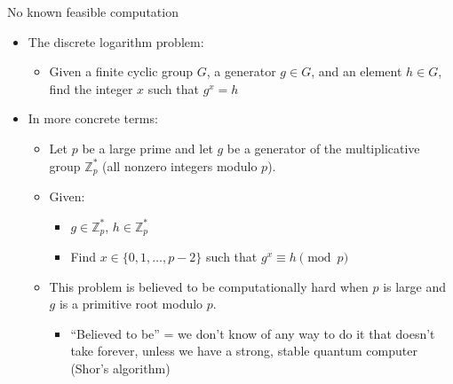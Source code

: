 \documentclass[aspectratio=169, lualatex, handout]{beamer}
\begin{document}
	\begin{frame}{No known feasible computation}
		\begin{itemize}
			\item The discrete logarithm problem:
				\begin{itemize}
					\item Given a finite cyclic group $G$, a generator $g \in G$, and an element
						$h \in G$, find the integer $x$ such that $g^{x}=h$
				\end{itemize}

			\item In more concrete terms:
				\begin{itemize}
					\item Let $p$ be a large prime and let $g$ be a generator of the multiplicative
						group $\mathbb{Z}_{p}^{*}$ (all nonzero integers modulo $p$).

					\item Given:
						\begin{itemize}
							\item $g \in \mathbb{Z}_{p}^{*}$, $h \in \mathbb{Z}_{p}^{*}$

							\item Find $x \in \{0, 1, \ldots, p-2\}$ such that $g^{x}\equiv h \pmod
								{p}$
						\end{itemize}

					\item This problem is believed to be computationally hard when $p$ is large
						and $g$ is a primitive root modulo $p$.
						\begin{itemize}
							\item ``Believed to be'' = we don't know of any way to do it that doesn't
								take forever, unless we have a strong, stable quantum computer (Shor's
								algorithm)
						\end{itemize}
				\end{itemize}
		\end{itemize}
	\end{frame}
\end{document}
